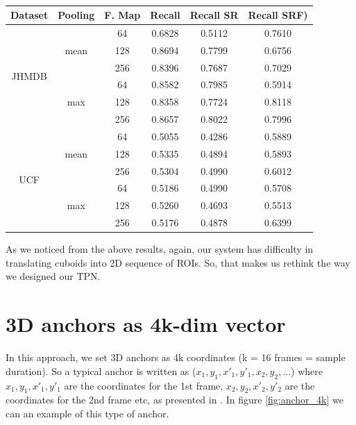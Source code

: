 \documentclass{report}
\begin{document}
\begin{table}[h]
  \centering
  \begin{tabular}{||c | c | c || c  c  c ||}
    \hline
    \textbf{Dataset} & \textbf{Pooling} & \textbf{F. Map} & \textbf{Recall} &  \textbf{ Recall SR}  &  \textbf{Recall SRF)} \\
    \hline
    \multirow{6}{*}{JHMDB} & \multirow{3}{*}{mean} & 64 &  0.6828  & 0.5112  & 0.7610 \\
    \cline{3-6}
    {} & {} & 128 & 0.8694 & 0.7799 & 0.6756 \\
    \cline{3-6}
    {} & {} & 256 & 0.8396 & 0.7687 & 0.7029 \\
    \cline{2-6}
    {} & \multirow{3}{*}{max} & 64 &  0.8582 & 0.7985 & 0.5914\\
    \cline{3-6}
    {} & {} & 128 & 0.8358 & 0.7724 & 0.8118 \\
    \cline{3-6}
    {} & {} & 256 & 0.8657 & 0.8022 & 0.7996 \\
    \hline
    \multirow{6}{*}{UCF} & \multirow{3}{*}{mean} & 64 & 0.5055 & 0.4286 & 0.5889 \\
    \cline{3-6}
    {} & {} & 128 & 0.5335 & 0.4894 & 0.5893 \\
    \cline{3-6}
    {} & {} & 256 & 0.5304 & 0.4990 & 0.6012 \\
    \cline{2-6}
    {} & \multirow{3}{*}{max} & 64 & 0.5186 & 0.4990 & 0.5708 \\
    \cline{3-6}
    {} & {} & 128 & 0.5260 & 0.4693 & 0.5513 \\
    \cline{3-6}
    {} & {} & 256 & 0.5176 & 0.4878 & 0.6399 \\
    \hline

  \end{tabular}
  \caption{}
  \label{table:reg_1_2}
\end{table}

As we noticed from the above results, again, our system has difficulty in translating cuboids into 2D sequence of ROIs.
So, that makes us rethink the way we designed our TPN.


\section{ 3D anchors as 4k-dim vector}
In this approach, we set 3D anchors as 4k coordinates (k = 16 frames = sample duration). So a typical anchor is written as ($x_1, y_1, x'_1, y'_1, x_2, y_2, ...$)
where $x_1, y_1, x'_1, y'_1 $ are the coordinates for the 1st frame, $x_2, y_2, x'_2, y'_2$ are the coordinates for the 2nd frame etc, as presented in \cite{DBLP:journals/corr/abs-1712-09184}.
In figure \ref{fig:anchor_4k} we can an example of this type of anchor.
\end{document}
